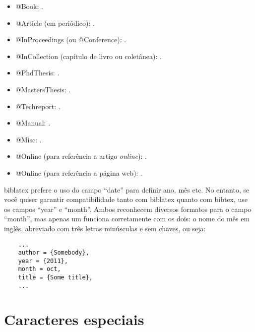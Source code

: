 \begin{multicols}{2}
  \begin{itemize}
    \item @Book: \cite{Knuth:96}.

    \item @Article (em periódico): \cite{floats2014}.

    \item @InProceedings (ou @Conference): \cite{alves03:simi}.

    \item @InCollection (capítulo de livro ou coletânea): \cite{bobaoglu93:concepts}.

    \item @PhdThesis: \cite{garcia01:PhD}.

    \item @MastersThesis: \cite{schmidt03:MSc}.

    \item @Techreport: \cite{alvisi99:analysisCIC}.

    \item @Manual: \cite{biblatex}.

    \item @Misc: \cite{gridftp}.

    \item @Online (para referência a artigo \emph{online}): \cite{fowler04:designDead}.

    \item @Online (para referência a página web): \cite{FSF:GNU-GPL}.
  \end{itemize}
\end{multicols}

\textsf{biblatex} prefere o uso do campo ``date'' para definir ano, mês
etc. No entanto, se você quiser garantir compatibilidade tanto com
\textsf{biblatex} quanto com \textsf{bibtex}, use os campos ``year'' e
``month''. Ambos reconhecem diversos formatos para o campo ``month'',
mas apenas um funciona corretamente com os dois: o nome do mês em inglês,
abreviado com três letras minúsculas e sem chaves, ou seja:

\begin{verbatim}
    ...
    author = {Somebody},
    year = {2011},
    month = oct,
    title = {Some title},
    ...
\end{verbatim}

\section{Caracteres especiais}

